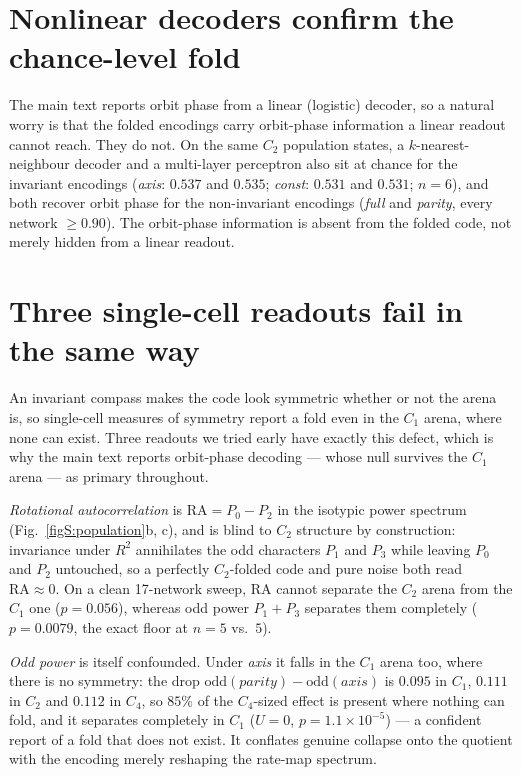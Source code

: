 \documentclass[10pt, letterpaper]{article}
\begin{document}
\clearpage
\section{Nonlinear decoders confirm the chance-level fold}

The main text reports orbit phase from a linear (logistic) decoder, so a natural worry is that the
folded encodings carry orbit-phase information a linear readout cannot reach. They do not. On the same
$C_2$ population states, a $k$-nearest-neighbour decoder and a multi-layer perceptron also sit at chance
for the invariant encodings (\textit{axis}: $0.537$ and $0.535$; \textit{const}: $0.531$ and $0.531$;
$n=6$), and both recover orbit phase for the non-invariant encodings (\textit{full} and \textit{parity},
every network $\ge 0.90$). The orbit-phase information is absent from the folded code, not merely hidden
from a linear readout.

\section{Three single-cell readouts fail in the same way}

An invariant compass makes the code look symmetric whether or not the arena is, so single-cell measures
of symmetry report a fold even in the $C_1$ arena, where none can exist. Three readouts we tried early
have exactly this defect, which is why the main text reports orbit-phase decoding --- whose null
survives the $C_1$ arena --- as primary throughout.

\emph{Rotational autocorrelation} is $\mathrm{RA} = P_0 - P_2$ in the isotypic power spectrum
(Fig.~\ref{figS:population}b, c), and is blind to $C_2$ structure by construction: invariance under
$R^2$ annihilates the odd characters $P_1$ and $P_3$ while leaving $P_0$ and $P_2$ untouched, so a
perfectly $C_2$-folded code and pure noise both read $\mathrm{RA}\approx0$. On a clean 17-network sweep,
$\mathrm{RA}$ cannot separate the $C_2$ arena from the $C_1$ one ($p=0.056$), whereas odd power
$P_1 + P_3$ separates them completely ($p=0.0079$, the exact floor at $n=5$ vs.\ $5$).

\emph{Odd power} is itself confounded. Under \textit{axis} it falls in the $C_1$ arena too, where there
is no symmetry: the drop $\mathrm{odd}(\textit{parity}) - \mathrm{odd}(\textit{axis})$ is $0.095$ in
$C_1$, $0.111$ in $C_2$ and $0.112$ in $C_4$, so $85\%$ of the $C_4$-sized effect is present where
nothing can fold, and it separates completely in $C_1$ ($U=0$, $p=1.1\times10^{-5}$) --- a confident
report of a fold that does not exist. It conflates genuine collapse onto the quotient with the encoding
merely reshaping the rate-map spectrum.
\end{document}
